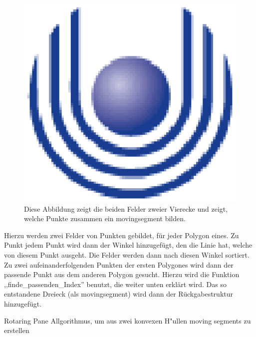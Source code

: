 \begin{figure}
	\centering
	\includegraphics{feu_logo2.eps}
	\caption[Tabellendarstellung des ,,rotating Pane'']{Diese Abbildung zeigt die beiden Felder zweier Vierecke und zeigt, welche Punkte zusammen ein movingsegment bilden.}
	\label{fig:RotatinPane}
\end{figure}


Hierzu werden zwei Felder von Punkten gebildet, für jeder Polygon eines. Zu Punkt jedem Punkt wird dann der Winkel hinzugefügt, den die Linie hat, welche von diesem Punkt ausgeht. Die Felder werden dann nach diesen Winkel sortiert. Zu zwei aufeinanderfolgenden Punkten der ersten Polygones wird dann der passende Punkt aus dem anderen Polygon gesucht. Hierzu wird die Funktion ,,finde\_passenden\_Index'' benutzt, die weiter unten erklärt wird. Das so entstandene Dreieck (als movingsegment) wird dann der Rückgabestruktur hinzugefügt.

\begin{algorithm}[!ht]
	\caption{Rotaring Pane Allgorithmus, um aus zwei konvexen H"ullen moving segments zu erstellen}
\end{algorithm}



